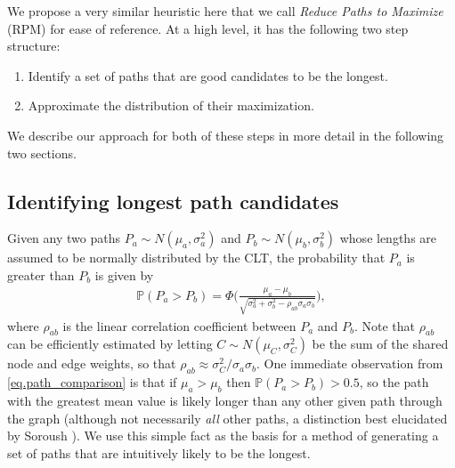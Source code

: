 \documentclass[12pt]{article}
\def\P{\mathbb{P}}
\begin{document}
We propose a very similar heuristic here that we call {\em Reduce Paths to Maximize} (RPM) for ease of reference. At a high level, it has the following two step structure:
\begin{enumerate}
\item Identify a set of paths that are good candidates to be the longest.
  \item Approximate the distribution of their maximization.
  \end{enumerate}
  We describe our approach for both of these steps in more detail in the following two sections.

\subsection{Identifying longest path candidates}
\label{subsect.identifying}

Given any two paths $P_a \sim N(\mu_a, \sigma_a^2)$ and $P_b \sim N(\mu_b, \sigma_b^2)$ whose lengths are assumed to be normally distributed by the CLT, the probability that $P_a$ is greater than $P_b$ is given by
\begin{align}
  \label{eq.path_comparison}
  \P(P_a > P_b) = \Phi \bigg( \frac{\mu_a - \mu_b}{\sqrt{\sigma_a^2 + \sigma_b^2 - \rho_{ab}\sigma_a \sigma_b}} \bigg),
\end{align}
where $\rho_{ab}$ is the linear correlation coefficient between $P_a$ and $P_b$. Note that $\rho_{ab}$ can be efficiently estimated by letting $C \sim N(\mu_C, \sigma_C^2)$ be the sum of the shared node and edge weights, so that $\rho_{ab} \approx \sigma_C^2 / \sigma_a \sigma_b$. 
One immediate observation from \eqref{eq.path_comparison} is that if $\mu_a > \mu_b$ then $\P(P_a > P_b) > 0.5$, so the path with the greatest mean value is likely longer than any other given path through the graph (although not necessarily {\em all} other paths, a distinction best elucidated by Soroush \cite{sor94}). We use this simple fact as the basis for a method of generating a set of paths that are intuitively likely to be the longest.
\end{document}
